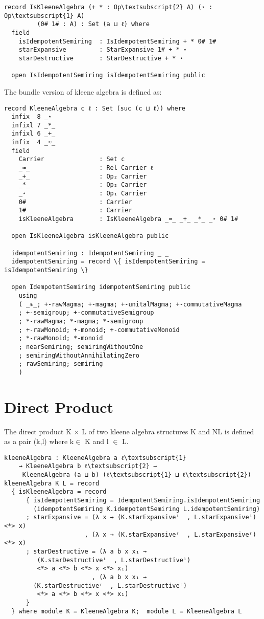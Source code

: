\begin{Verbatim}[commandchars=\\\{\},samepage=true]
record IsKleeneAlgebra (+ * : Op\textsubscript{2} A) (⋆ : Op\textsubscript{1} A)
		 (0# 1# : A) : Set (a ⊔ ℓ) where
  field
    isIdempotentSemiring  : IsIdempotentSemiring + * 0# 1#
    starExpansive         : StarExpansive 1# + * ⋆
    starDestructive       : StarDestructive + * ⋆

  open IsIdempotentSemiring isIdempotentSemiring public
\end{Verbatim}
The bundle version of kleene algebra is defined as: 
\begin{Verbatim}[commandchars=\\\{\},samepage=true]
record KleeneAlgebra c ℓ : Set (suc (c ⊔ ℓ)) where
  infix  8 _⋆
  infixl 7 _*_
  infixl 6 _+_
  infix  4 _≈_
  field
    Carrier               : Set c
    _≈_                   : Rel Carrier ℓ
    _+_                   : Op₂ Carrier
    _*_                   : Op₂ Carrier
    _⋆                    : Op₁ Carrier
    0#                    : Carrier
    1#                    : Carrier
    isKleeneAlgebra       : IsKleeneAlgebra _≈_ _+_ _*_ _⋆ 0# 1#

  open IsKleeneAlgebra isKleeneAlgebra public

  idempotentSemiring : IdempotentSemiring _ _
  idempotentSemiring = record \{ isIdempotentSemiring = isIdempotentSemiring \}

  open IdempotentSemiring idempotentSemiring public
    using
    ( _≉_; +-rawMagma; +-magma; +-unitalMagma; +-commutativeMagma
    ; +-semigroup; +-commutativeSemigroup
    ; *-rawMagma; *-magma; *-semigroup
    ; +-rawMonoid; +-monoid; +-commutativeMonoid
    ; *-rawMonoid; *-monoid
    ; nearSemiring; semiringWithoutOne
    ; semiringWithoutAnnihilatingZero
    ; rawSemiring; semiring
    )
\end{Verbatim}
\section{Direct Product}
The direct product K \(\times\) L of two kleene algebra structures K and NL is defined as a pair (k,l) where k\(\in\) K and l \(\in\) L.
\begin{Verbatim}
kleeneAlgebra : KleeneAlgebra a ℓ\textsubscript{1} 
	→ KleeneAlgebra b ℓ\textsubscript{2} →
	 KleeneAlgebra (a ⊔ b) (ℓ\textsubscript{1} ⊔ ℓ\textsubscript{2})
kleeneAlgebra K L = record
  { isKleeneAlgebra = record
      { isIdempotentSemiring = IdempotentSemiring.isIdempotentSemiring 
		(idempotentSemiring K.idempotentSemiring L.idempotentSemiring)
      ; starExpansive = (λ x → (K.starExpansiveˡ  , L.starExpansiveˡ) <*> x)
                      , (λ x → (K.starExpansiveʳ  , L.starExpansiveʳ) <*> x)
      ; starDestructive = (λ a b x x₁ →
		 (K.starDestructiveˡ  , L.starDestructiveˡ)
		 <*> a <*> b <*> x <*> x₁)
                        , (λ a b x x₁ → 
		(K.starDestructiveʳ  , L.starDestructiveʳ)
		 <*> a <*> b <*> x <*> x₁)
      }
  } where module K = KleeneAlgebra K;  module L = KleeneAlgebra L
\end{Verbatim}

